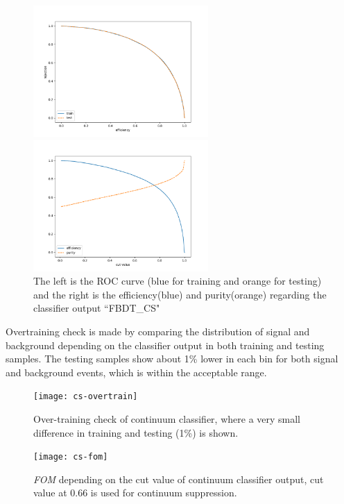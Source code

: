 \begin{figure}[ht]
	\begin{minipage}[b]{0.5\linewidth}
		\centering 
		\includegraphics[height=5cm]{figures/ROC_CS}	
	\end{minipage}
	\begin{minipage}[b]{0.5\linewidth}
		\centering 
		\includegraphics[height=5cm]{figures/eff_CS}	
	\end{minipage}
\caption{The left is the ROC curve (blue for training and orange for testing)
	and the right is the efficiency(blue) and purity(orange) regarding the classifier output ``FBDT\_CS"}
	\label{fig:cs_roc}
\end{figure}

Overtraining check is made by comparing the distribution of signal and background depending on the classifier output in both training and testing samples. The testing samples show about 1\% lower in each bin for both signal and background events, which is within the acceptable range.  
\begin{figure}[H]
	\centering
	\texttt{[image: cs-overtrain]}
	\caption{Over-training check of continuum classifier, where a very small difference in training and testing (1\%) is shown.}
\end{figure}

\begin{figure}[H]
	\centering
	\texttt{[image: cs-fom]}
	\caption{\textit{FOM} depending on the cut value of continuum classifier output, cut value at 0.66 is used for continuum suppression. }
	\label{fig:cs_fom}
\end{figure}

